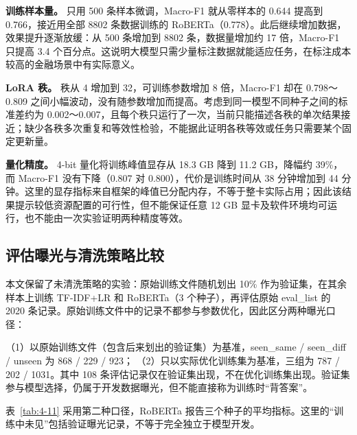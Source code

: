 \textbf{训练样本量。} 只用 500 条样本微调，Macro-F1 就从零样本的 0.644 提高到 0.766，接近用全部 8802 条数据训练的 RoBERTa（0.778）。此后继续增加数据，效果提升逐渐放缓：从 500 条增加到 8802 条，数据量增加约 17 倍，Macro-F1 只提高 3.4 个百分点。这说明大模型只需少量标注数据就能适应任务，在标注成本较高的金融场景中有实际意义。

\textbf{LoRA 秩。} 秩从 4 增加到 32，可训练参数增加 8 倍，Macro-F1 却在 0.798～0.809 之间小幅波动，没有随参数增加而提高。考虑到同一模型不同种子之间的标准差约为 0.002～0.007，且每个秩只运行了一次，当前只能描述各秩的单次结果接近；缺少各秩多次重复和等效性检验，不能据此证明各秩等效或任务只需要某个固定更新量。

\textbf{量化精度。} 4-bit 量化将训练峰值显存从 18.3 GB 降到 11.2 GB，降幅约 39\%，而 Macro-F1 没有下降（0.807 对 0.800），代价是训练时间从 38 分钟增加到 44 分钟。这里的显存指标来自框架的峰值已分配内存，不等于整卡实际占用；因此该结果提示较低资源配置的可行性，但不能保证任意 12 GB 显卡及软件环境均可运行，也不能由一次实验证明两种精度等效。

\FloatBarrier\subsection{评估曝光与清洗策略比较}

本文保留了未清洗策略的实验：原始训练文件随机划出 10\% 作为验证集，在其余样本上训练 TF-IDF+LR 和 RoBERTa（3 个种子），再评估原始 eval\_list 的 2020 条记录。原始训练文件中的记录不都参与参数优化，因此区分两种曝光口径：

（1）以原始训练文件（包含后来划出的验证集）为基准，seen\_same / seen\_diff / unseen 为 868 / 229 / 923； （2）只以实际优化训练集为基准，三组为 787 / 202 / 1031。其中 108 条评估记录仅在验证集出现，不在优化训练集出现。验证集参与模型选择，仍属于开发数据曝光，但不能直接称为训练时``背答案''。

表~\ref{tab:4-11} 采用第二种口径，RoBERTa 报告三个种子的平均指标。这里的``训练中未见''包括验证曝光记录，不等于完全独立于模型开发。

